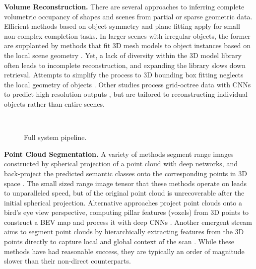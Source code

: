 \documentclass{article}
\begin{document}
\textbf{Volume Reconstruction.} There are several approaches to inferring complete volumetric occupancy of shapes and scenes from partial or sparse geometric data. Efficient methods based on object symmetry \cite{kmyg_acquireIndoor_sigga12, schiebener2016heuristic} and plane fitting \cite{monszpart2015rapter} apply for small non-complex completion tasks. In larger scenes with irregular objects, the former are supplanted by methods that fit 3D mesh models to object instances based on the local scene geometry \cite{gupta2013perceptual, gupta2015aligning, geiger2015joint, li2015database}. Yet, a lack of diversity within the 3D model library often leads to incomplete reconstruction, and expanding the library slows down retrieval. Attempts to simplify the process to 3D bounding box fitting neglects the local geometry of objects \cite{jiang2013linear, song2016deep}. Other studies process grid-octree data with CNNs to predict high resolution outputs \cite{riegler2017octnetfusion, tatarchenko2017octree}, but are tailored to reconstructing individual objects rather than entire scenes.

\setlength{\columnsep}{5pt}\begin{wrapfigure}{r}{8cm}
  \centering
  \\
  \captionsetup{font=scriptsize,labelfont=scriptsize}
  \caption{Full system pipeline.}
  \label{fig:system_pipeline}
  \vspace{-10px}
\end{wrapfigure}

\textbf{Point Cloud Segmentation.} A variety of methods segment range images constructed by spherical projection of a point cloud with deep networks, and back-project the predicted semantic classes onto the corresponding points in 3D space \cite{wu2019squeezesegv2, wang2018pointseg, dewan2019deeptemporalseg}. The small sized range image tensor that these methods operate on leads to unparalleled speed, but  of the original point cloud is unrecoverable after the initial spherical projection. Alternative approaches project point clouds onto a bird's eye view perspective, computing pillar features (voxels) from 3D points to construct a BEV map and process it with deep CNNs \cite{yang2018hdnet, aksoy2019salsanet}. Another emergent stream aims to segment point clouds by hierarchically extracting features from the 3D points directly to capture local and global context of the scan \cite{qi2017pointnet++, hu2020randla}. While these methods have had reasonable success, they are typically an order of magnitude slower than their non-direct counterparts. 
\end{document}
